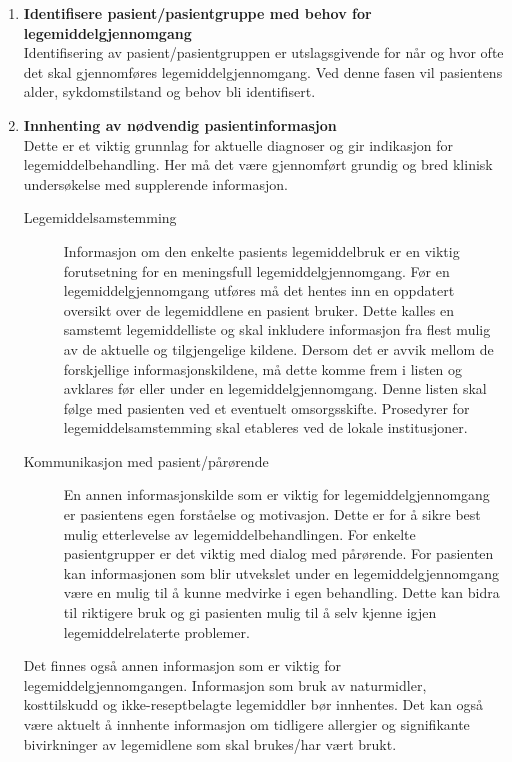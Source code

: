 \begin{enumerate}
\item \textbf{Identifisere pasient/pasientgruppe med behov for legemiddelgjennomgang}\\ 
Identifisering av pasient/pasientgruppen er utslagsgivende for når og hvor ofte det skal gjennomføres legemiddelgjennomgang.
Ved denne fasen vil pasientens alder, sykdomstilstand og behov bli identifisert.
\item 
\textbf{Innhenting av nødvendig pasientinformasjon}\\ 
Dette er et viktig grunnlag for aktuelle diagnoser og gir indikasjon for legemiddelbehandling. Her må det være gjennomført grundig og bred klinisk undersøkelse med supplerende informasjon. 

\begin{description}
\item[Legemiddelsamstemming]
Informasjon om den enkelte pasients legemiddelbruk er en viktig forutsetning for en meningsfull legemiddelgjennomgang.
Før en legemiddelgjennomgang utføres må det hentes inn en oppdatert oversikt over de legemiddlene en pasient bruker. Dette kalles en samstemt legemiddelliste og skal inkludere informasjon fra flest mulig av de aktuelle og tilgjengelige kildene. Dersom det er avvik mellom de forskjellige informasjonskildene, må dette komme frem i listen og avklares før eller under en legemiddelgjennomgang. Denne listen skal følge med pasienten ved et eventuelt omsorgsskifte. Prosedyrer for legemiddelsamstemming skal etableres ved de lokale institusjoner.
\end{description}

\begin{description}
\item[Kommunikasjon med pasient/pårørende] 
En annen informasjonskilde som er viktig for legemiddelgjennomgang er pasientens egen forståelse og motivasjon. Dette er for å sikre best mulig etterlevelse av legemiddelbehandlingen. For enkelte pasientgrupper er det viktig med dialog med pårørende. For pasienten kan informasjonen som blir utvekslet under en legemiddelgjennomgang være en mulig til å kunne medvirke i egen behandling. Dette kan bidra til riktigere bruk og gi pasienten mulig til å selv kjenne igjen legemiddelrelaterte problemer.
\end{description}

Det finnes også annen informasjon som er viktig for legemiddelgjennomgangen. Informasjon som bruk av naturmidler, kosttilskudd og ikke-reseptbelagte legemiddler bør innhentes. Det kan også være aktuelt å innhente informasjon om tidligere allergier og signifikante bivirkninger av legemidlene som skal brukes/har vært brukt.


\end{enumerate}
